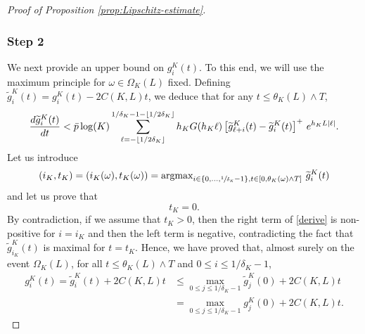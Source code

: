 \documentclass[10pt]{amsart}
\theoremstyle{plain}
\theoremstyle{remark}
\begin{document}
\begin{proof}[Proof of Proposition \ref{prop:Lipschitz-estimate}]
{\subsubsection*{Step 2} We next provide an upper bound on $g_i^K(t)$. To this end, we will
use the maximum principle for $\omega\in\Omega_K(L)$ fixed.
Defining $\widetilde g^K_{i}(t) = g^K_{i}(t) -2C(K,L) t$,
we deduce that for any $t\le \theta_{K}(L)\wedge T$,
\begin{equation}\label{derive}
{d \widetilde g^K_{i}(t)\over dt} < \bar p \log(K)
\sum_{\ell=-\lfloor 1/2\delta_K\rfloor}^{1/\delta_K-1-\lfloor 1/2\delta_K\rfloor}
h_{K} G(h_{K}\ell) \left[\widetilde g^K_{\ell+i}(t) - \widetilde g^K_{i}(t)\right]^+ \, e^{h_{K}L|\ell|}.
\end{equation}
Let us introduce
\[(i_{K}, t_{K}) = (i_K(\omega),t_K(\omega))=\text{argmax}_{{i\in \{0,\dots, \sfrac{1}{\delta_{K}}-1\}, t\in [0, \theta_{K}(\omega)\wedge T]}}\ \widetilde g^K_{i}(t)\]
and let us prove that \[t_{K}=0.\]
By contradiction, if we assume that $t_{K}>0$, then the right term of \eqref{derive} is non-positive for $i=i_{K}$ and then the
left term is negative, contradicting the fact that $\widetilde g^K_{i_K}(t)$ is maximal for $t=t_K$. Hence, we have proved that, almost surely on
the event $\Omega_K(L)$, for all $t\leq \theta_K(L)\wedge T$ and $0\leq i\leq 1/\delta_K-1$,
\begin{align*}
g^K_i(t)= \widetilde g^K_i(t)+2C(K,L) t
&\leq \max_{0\leq j\leq 1/\delta_K-1}\widetilde g^K _j(0)+2 C(K,L) t\\
&= \max_{0\leq j\leq 1/\delta_K-1} g^K _j(0)+2C(K,L) t.
\end{align*}

}
\end{proof}
\end{document}
